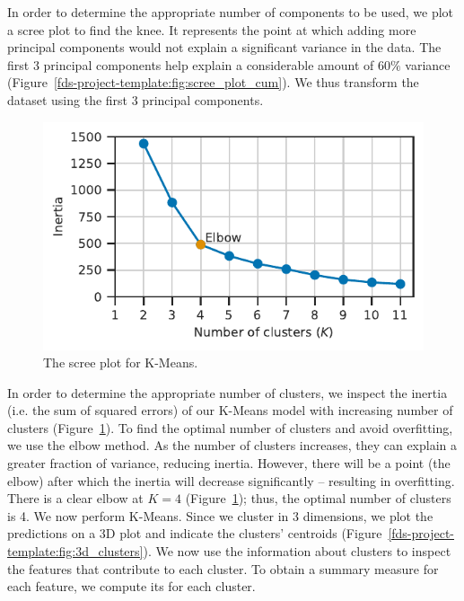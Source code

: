 \documentclass[11pt,a4paper]{article}
\begin{document}
In order to determine the appropriate number of components to be used, we plot a scree plot to find the knee. It represents the point at which adding more principal components would not explain a significant variance in the data. The first 3 principal components help explain a considerable amount of $60\%$ variance (Figure~\ref{fds-project-template:fig:scree_plot_cum}). We thus transform the dataset using the first 3 principal components.
\begin{figure}[h!]
  \centering
  \includegraphics{report/k_screeplot.pdf}
  \caption{The scree plot for K-Means.}
  \label{fds-project-template:fig:k_screeplot}
\end{figure}

In order to determine the appropriate number of clusters, we inspect the inertia (i.e. the sum of squared errors) of our K-Means model with increasing number of clusters (Figure~\ref{fds-project-template:fig:k_screeplot}). To find the optimal number of clusters and avoid overfitting, we use the elbow method. As the number of clusters increases, they can explain a greater fraction of variance, reducing inertia. However, there will be a point (the elbow) after which the inertia will decrease significantly \cite{wiki:elbow} – resulting in overfitting. There is a clear elbow at $K = 4$ (Figure~\ref{fds-project-template:fig:k_screeplot}); thus, the optimal number of clusters is 4. We now perform K-Means. Since we cluster in 3 dimensions, we plot the predictions on a 3D plot and indicate the clusters' centroids (Figure~\ref{fds-project-template:fig:3d_clusters}). We now use the information about clusters to inspect the features that contribute to each cluster. To obtain a summary measure for each feature, we compute its for each cluster.
\end{document}

